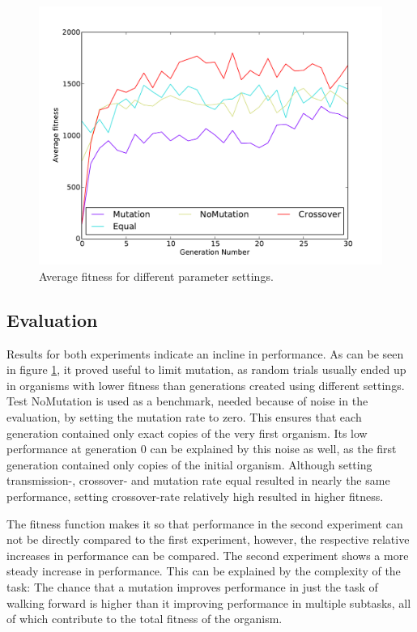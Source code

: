 \documentclass{article}
\begin{document}
\begin{figure}[h!]
	\center
	\includegraphics[width=.65\textwidth]{images/relevant_avg.pdf}
	\caption{Average fitness for different parameter settings.}
	\label{fig:avgforward}
\end{figure}


\subsection{Evaluation}
Results for both experiments indicate an incline in performance. As can be seen in figure \ref{fig:avgforward}, it proved useful to limit mutation, as random trials usually ended up in organisms with lower fitness than generations created using different settings. Test NoMutation is used as a benchmark, needed because of noise in the evaluation, by setting the mutation rate to zero. This ensures that each generation contained only exact copies of the very first organism. Its low performance at generation 0 can be explained by this noise as well, as the first generation contained only copies of the initial organism. Although setting transmission-, crossover- and mutation rate equal resulted in nearly the same performance, setting crossover-rate relatively high resulted in higher fitness. 

The fitness function makes it so that performance in the second experiment can not be directly compared to the first experiment, however, the respective relative increases in performance can be compared. The second experiment shows a more steady increase in performance. This can be explained by the complexity of the task: The chance that a mutation improves performance in just the task of walking forward is higher than it improving performance in multiple subtasks, all of which contribute to the total fitness of the organism. 
\end{document}

